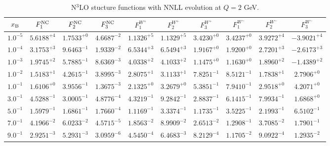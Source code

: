 \begin{table}[h]
\begin{adjustbox}{width=\textwidth}
\begin{tabular}{|c||c|c|c|c|c|c|c|c|c|}
\hline
$x_{\rm B}$ & $F_1^{\rm NC}$ & $F_2^{\rm NC}$ & $F_3^{\rm NC}$ & $F_1^{W^+}$ & $F_2^{W^+}$ & $F_3^{W^+}$ & $F_1^{W^-}$ & $F_2^{W^-}$ & $F_3^{W^-}$ \\
\hline
$ 1.0^{-5}$ & $ 5.6188^{+4}$ & $ 1.7533^{+0}$ & $ 4.6687^{-2}$ & $ 1.1326^{+5}$ & $ 1.1329^{+5}$ & $ 3.4230^{+0}$ & $ 3.4237^{+0}$ & $ 3.9272^{+4}$ & $-3.9021^{+4}$ \\
$ 1.0^{-4}$ & $ 3.1753^{+3}$ & $ 9.6463^{-1}$ & $ 1.9339^{-2}$ & $ 6.5344^{+3}$ & $ 6.5494^{+3}$ & $ 1.9167^{+0}$ & $ 1.9200^{+0}$ & $ 2.7201^{+3}$ & $-2.6173^{+3}$ \\
$ 1.0^{-3}$ & $ 1.9745^{+2}$ & $ 5.7885^{-1}$ & $ 8.6369^{-3}$ & $ 4.0338^{+2}$ & $ 4.1033^{+2}$ & $ 1.1475^{+0}$ & $ 1.1630^{+0}$ & $ 1.8960^{+2}$ & $-1.4389^{+2}$ \\
$ 1.0^{-2}$ & $ 1.5183^{+1}$ & $ 4.2615^{-1}$ & $ 3.8995^{-3}$ & $ 2.8075^{+1}$ & $ 3.1133^{+1}$ & $ 7.8251^{-1}$ & $ 8.5121^{-1}$ & $ 1.7838^{+1}$ & $ 2.7906^{+0}$ \\
$ 1.0^{-1}$ & $ 1.6106^{+0}$ & $ 3.9556^{-1}$ & $ 1.3675^{-3}$ & $ 2.1325^{+0}$ & $ 3.2679^{+0}$ & $ 5.3851^{-1}$ & $ 7.9410^{-1}$ & $ 2.9518^{+0}$ & $ 4.2071^{+0}$ \\
$ 3.0^{-1}$ & $ 4.5288^{-1}$ & $ 3.0005^{-1}$ & $ 4.8776^{-4}$ & $ 4.3219^{-1}$ & $ 9.2842^{-1}$ & $ 2.8837^{-1}$ & $ 6.1415^{-1}$ & $ 7.9934^{-1}$ & $ 1.6868^{+0}$ \\
$ 5.0^{-1}$ & $ 1.5979^{-1}$ & $ 1.6861^{-1}$ & $ 1.7660^{-4}$ & $ 1.1169^{-1}$ & $ 3.3374^{-1}$ & $ 1.1735^{-1}$ & $ 3.5225^{-1}$ & $ 2.1993^{-1}$ & $ 6.5102^{-1}$ \\
$ 7.0^{-1}$ & $ 4.1966^{-2}$ & $ 6.0233^{-2}$ & $ 4.5715^{-5}$ & $ 1.8563^{-2}$ & $ 8.9909^{-2}$ & $ 2.6513^{-2}$ & $ 1.2908^{-1}$ & $ 3.7085^{-2}$ & $ 1.7901^{-1}$ \\
$ 9.0^{-1}$ & $ 2.9251^{-3}$ & $ 5.2931^{-3}$ & $ 3.0959^{-6}$ & $ 4.5450^{-4}$ & $ 6.4683^{-3}$ & $ 8.2129^{-4}$ & $ 1.1705^{-2}$ & $ 9.0922^{-4}$ & $ 1.2935^{-2}$ \\
\hline
\end{tabular}
\end{adjustbox}\caption{N$^{3}$LO stucture functions with NNLL evolution at $Q = 2$ GeV.}
\label{tab:N3LO-Q2}
\end{table}


